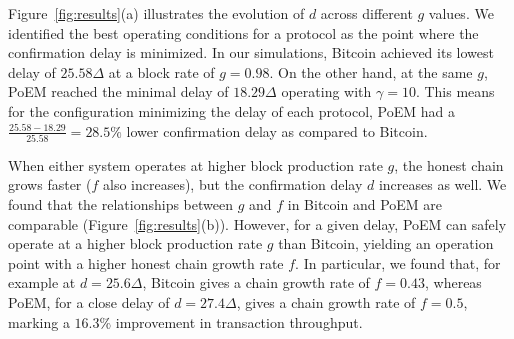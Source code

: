 Figure~\ref{fig:results}(a) illustrates the evolution of $d$ across different $g$ values. We
identified the best operating conditions for a protocol as the point where the
confirmation delay is minimized. In our simulations, Bitcoin achieved its lowest
delay of $25.58 \Delta$ at a block rate of $g=0.98$. On the other hand, at the same
$g$, PoEM reached the minimal delay of $18.29 \Delta$ operating with
$\gamma=10$. This means for the configuration minimizing the delay of each protocol,
PoEM had a $\frac{25.58 - 18.29}{25.58} = 28.5\%$ lower confirmation delay as compared to Bitcoin.

When either system operates at higher block production rate $g$, the honest chain
grows faster ($f$ also increases), but the confirmation delay $d$ increases as well.
We found that the relationships between $g$ and $f$ in Bitcoin and PoEM are
comparable (Figure~\ref{fig:results}(b)). However, for a given delay, PoEM can
safely operate at a higher block production rate $g$ than Bitcoin, yielding an
operation point with a higher honest chain growth rate $f$. In particular, we
found that, for example at $d = 25.6\Delta$, Bitcoin gives a chain growth rate
of $f = 0.43$, whereas PoEM, for a close delay of $d = 27.4\Delta$,
gives a chain growth rate of $f = 0.5$, marking a $16.3\%$ improvement in
transaction throughput.
